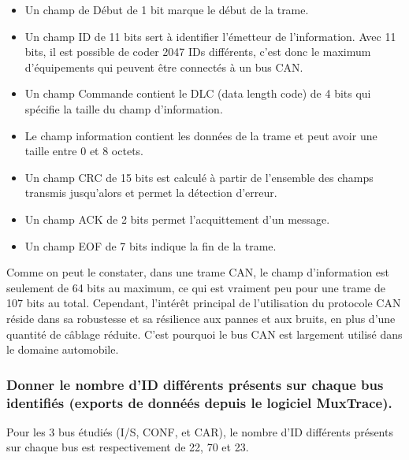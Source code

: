 \documentclass{rapportECC}
\begin{document}
\begin{itemize}
    \item Un champ de Début de 1 bit marque le début de la trame.
    \item Un champ ID de 11 bits sert à identifier l'émetteur de l'information. Avec 11 bits, il est possible de coder 2047 IDs différents, c'est donc le maximum d'équipements qui peuvent être connectés à un bus CAN.
    \item Un champ Commande contient le DLC (data length code) de 4 bits qui spécifie la taille du champ d'information.
    \item Le champ information contient les données de la trame et peut avoir une taille entre 0 et 8 octets.
    \item Un champ CRC de 15 bits est calculé à partir de l'ensemble des champs transmis jusqu'alors et permet la détection d'erreur.
    \item Un champ ACK de 2 bits permet l'acquittement d'un message.
    \item Un champ EOF de 7 bits indique la fin de la trame.
\end{itemize}

Comme on peut le constater, dans une trame CAN, le champ d'information est seulement de 64 bits au maximum, ce qui est vraiment peu pour une trame de 107 bits au total. Cependant, l'intérêt principal de l'utilisation du protocole CAN réside dans sa robustesse et sa résilience aux pannes et aux bruits, en plus d'une quantité de câblage réduite. C'est pourquoi le bus CAN est largement utilisé dans le domaine automobile.


\subsubsection*{Donner le nombre d'ID différents présents sur chaque bus identifiés (exports de donnéés depuis le logiciel MuxTrace).}

Pour les 3 bus étudiés (I/S, CONF, et CAR), le nombre d'ID différents présents sur chaque bus est respectivement de 22, 70 et 23.

\end{document}
